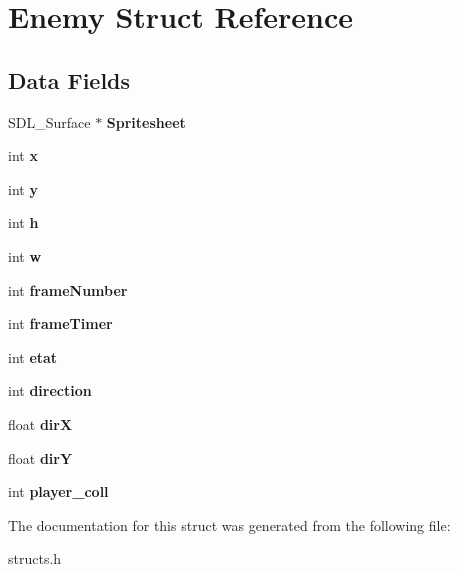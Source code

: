 \hypertarget{structEnemy}{}\section{Enemy Struct Reference}
\label{structEnemy}
\subsection*{Data Fields}
\begin{DoxyCompactItemize}
\item 
\mbox{\label{structEnemy_aecbccb124f10657afade892a23c2d055}} 
S\+D\+L\+\_\+\+Surface $\ast$ {\bfseries Spritesheet}
\item 
\mbox{\label{structEnemy_a3f489990c857f70c344988fe250effdf}} 
int {\bfseries x}
\item 
\mbox{\label{structEnemy_ae6f21ae3cc9bbc056cdff18d2044cfdd}} 
int {\bfseries y}
\item 
\mbox{\label{structEnemy_adcb5512e63e735485cbb83f763acce75}} 
int {\bfseries h}
\item 
\mbox{\label{structEnemy_a259bfaab0f0d06c9ec2cb15c787e0b3a}} 
int {\bfseries w}
\item 
\mbox{\label{structEnemy_a1ecd2a3e437852b35515d9f3fe6b1c04}} 
int {\bfseries frame\+Number}
\item 
\mbox{\label{structEnemy_a8b24ac38df6f12f716a580e45aaa2069}} 
int {\bfseries frame\+Timer}
\item 
\mbox{\label{structEnemy_af9a802457d35af3ec1b0fe6cf37fcea5}} 
int {\bfseries etat}
\item 
\mbox{\label{structEnemy_a1de1605c4b41f74c3b0f4023258323ab}} 
int {\bfseries direction}
\item 
\mbox{\label{structEnemy_a8a5ae48b8235ff80a416bb9b118e8a25}} 
float {\bfseries dirX}
\item 
\mbox{\label{structEnemy_a8f697e039cdc044bf6fa864f8a9fd8e3}} 
float {\bfseries dirY}
\item 
\mbox{\label{structEnemy_a3b5343a7b812f6d59c79ba438f38ee53}} 
int {\bfseries player\+\_\+coll}
\end{DoxyCompactItemize}


The documentation for this struct was generated from the following file\+:\begin{DoxyCompactItemize}
\item 
structs.\+h\end{DoxyCompactItemize}
